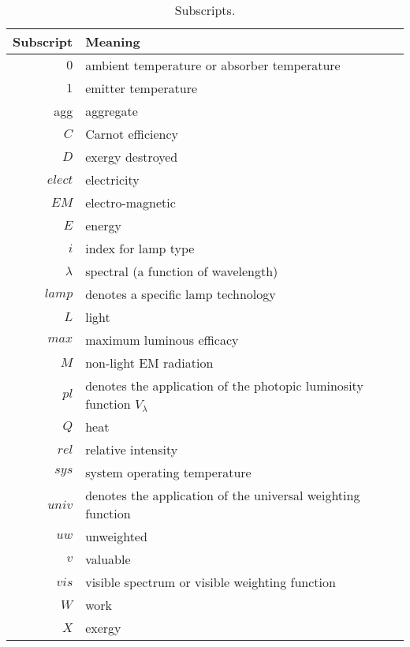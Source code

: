 \begin{table}
\centering
\caption{Subscripts.}
\begin{tabular}{r l}
\toprule
Subscript & Meaning \\
\midrule
$0$ & ambient temperature or absorber temperature \\
$1$ & emitter temperature \\
agg & aggregate \\
$C$ & Carnot efficiency \\
$D$ & exergy destroyed \\
$elect$ & electricity \\
$EM$ & electro-magnetic \\
$E$ & energy \\
$i$ & index for lamp type \\
$\lambda$ & spectral (a function of wavelength) \\
$lamp$ & denotes a specific lamp technology \\
$L$ & light \\
$max$ & maximum luminous efficacy \\
$M$ & non-light EM radiation \\
$pl$ & denotes the application of the photopic luminosity function $V_{\lambda}$ \\
$Q$ & heat \\
$rel$ & relative intensity \\
$sys$ & system operating temperature \\
$univ$ & denotes the application of the universal weighting function \\
$uw$ & unweighted \\
$v$ & valuable \\
$vis$ & visible spectrum or visible weighting function \\
$W$ & work \\
$X$ & exergy \\
\bottomrule
\end{tabular}
\label{tab:subscripts}
\end{table}


